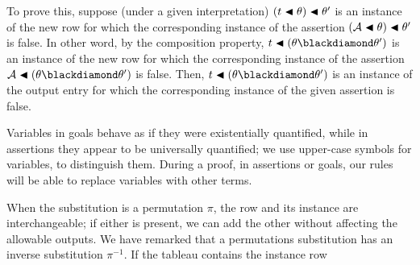 \documentclass[runningheads]{llncs}
\begin{document}
To prove this, suppose (under a given interpretation) $(t\blacktriangleleft\theta)\blacktriangleleft \theta'$ is an instance of the new row for which the corresponding instance of the assertion $(\mathcal{A}\blacktriangleleft \theta) \blacktriangleleft \theta'$ is false.
In other word, by the composition property, $t\apply(\theta \compose \theta')$  is an instance of the new row for which the corresponding instance of the assertion $\mathcal{A}\apply (\theta \compose \theta')$ is false. Then, $t\apply(\theta \compose \theta')$ is an instance of the output entry for which the corresponding instance of the given assertion is false.


Variables in goals behave as if they were existentially quantified, while in assertions they appear to be universally quantified; we use upper-case symbols for variables, to distinguish them. During a proof, in assertions or goals, our rules will be able to replace variables with other terms.


When the substitution is a permutation $\pi$, the row and its instance are interchangeable; if either is present, we can add the other without affecting the allowable outputs.  We have remarked that a permutations substitution has an inverse substitution $\pi^{-1}$.  If the tableau contains the instance row
\end{document}
